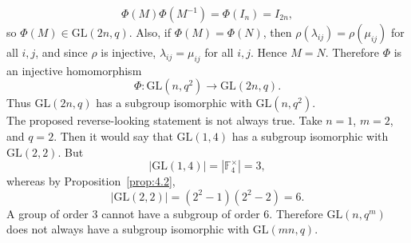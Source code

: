 \documentclass[../Odyssey_Project.tex]{subfiles}
\begin{document}
\begin{solution}
\[
    \Phi(M)\Phi(M^{-1})=\Phi(I_n)=I_{2n},
\]
so $\Phi(M)\in \mathrm{GL}(2n,q)$. Also, if $\Phi(M)=\Phi(N)$, then $\rho(\lambda_{ij})=\rho(\mu_{ij})$ for all $i,j$, and since $\rho$ is injective, $\lambda_{ij}=\mu_{ij}$ for all $i,j$. Hence $M=N$. Therefore $\Phi$ is an injective homomorphism
\[
    \Phi\colon \mathrm{GL}(n,q^2)\to \mathrm{GL}(2n,q).
\]
Thus $\mathrm{GL}(2n,q)$ has a subgroup isomorphic with $\mathrm{GL}(n,q^2)$.\\
The proposed reverse-looking statement is not always true. Take $n=1$, $m=2$, and $q=2$. Then it would say that $\mathrm{GL}(1,4)$ has a subgroup isomorphic with $\mathrm{GL}(2,2)$. But
\[
    |\mathrm{GL}(1,4)|=|\mathbb{F}_4^\times|=3,
\]
whereas by Proposition~\ref{prop:4.2},
\[
    |\mathrm{GL}(2,2)|=(2^2-1)(2^2-2)=6.
\]
A group of order $3$ cannot have a subgroup of order $6$. Therefore $\mathrm{GL}(n,q^m)$ does not always have a subgroup isomorphic with $\mathrm{GL}(mn,q)$.
\end{solution}
\end{document}
